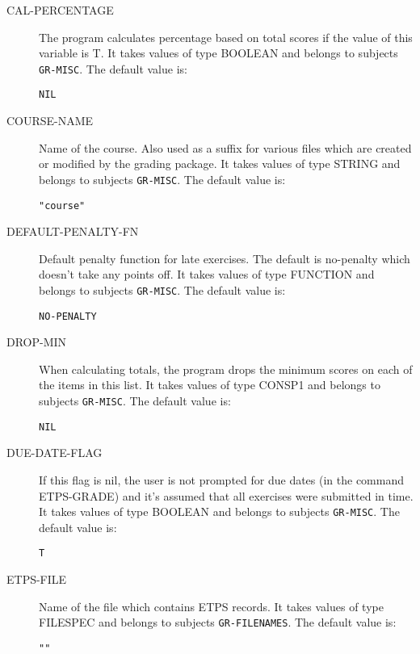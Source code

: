 \begin{description} 
\item[CAL-PERCENTAGE]  
The program calculates percentage based on total scores if the
	 value of this variable is T.
It takes values of type BOOLEAN and belongs to subjects \texttt{GR-MISC}.  The default value is: \begin{lstlisting}
NIL
\end{lstlisting}

\item[COURSE-NAME]  
Name of the course. Also used as a suffix for various
	 files which are created or modified by the grading package.
It takes values of type STRING and belongs to subjects \texttt{GR-MISC}.  The default value is: \begin{lstlisting}
"course"
\end{lstlisting}

\item[DEFAULT-PENALTY-FN]  
Default penalty function for late exercises. The default is no-penalty which
 doesn't take any points off.
It takes values of type FUNCTION and belongs to subjects \texttt{GR-MISC}.  The default value is: \begin{lstlisting}
NO-PENALTY
\end{lstlisting}

\item[DROP-MIN]  
When calculating totals, the program drops the minimum scores
	 on each of the items in this list.
It takes values of type CONSP1 and belongs to subjects \texttt{GR-MISC}.  The default value is: \begin{lstlisting}
NIL
\end{lstlisting}

\item[DUE-DATE-FLAG]  
If this flag is nil, the user is not prompted for due dates (in the command
ETPS-GRADE) and it's assumed that all exercises were submitted in time.
It takes values of type BOOLEAN and belongs to subjects \texttt{GR-MISC}.  The default value is: \begin{lstlisting}
T
\end{lstlisting}

\item[ETPS-FILE]  
Name of the file which contains ETPS records.
It takes values of type FILESPEC and belongs to subjects \texttt{GR-FILENAMES}.  The default value is: \begin{lstlisting}
""
\end{lstlisting}


\end{description}
